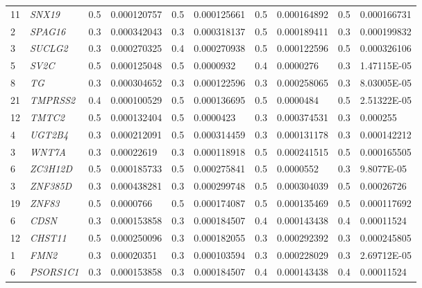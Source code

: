 \begin{refsection}
\begin{otherlanguage}{english}
\begin{scriptsize}
\begin{longtable}{llllllllll}
11 & \cellcolor[HTML]{009901}\textit{SNX19} & 0.5 & 0.000120757 & 0.5 & 0.000125661 & 0.5 & 0.000164892 & 0.5 & 0.000166731 \\
2 & \cellcolor[HTML]{009901}\textit{SPAG16} & 0.3 & 0.000342043 & 0.3 & 0.000318137 & 0.5 & 0.000189411 & 0.3 & 0.000199832 \\
3 & \cellcolor[HTML]{009901}\textit{SUCLG2} & 0.3 & 0.000270325 & 0.4 & 0.000270938 & 0.5 & 0.000122596 & 0.5 & 0.000326106 \\
5 & \cellcolor[HTML]{009901}\textit{SV2C} & 0.5 & 0.000125048 & 0.5 & 0.0000932 & 0.4 & 0.0000276 & 0.3 & 1.47115E-05 \\
8 & \cellcolor[HTML]{009901}\textit{TG} & 0.3 & 0.000304652 & 0.3 & 0.000122596 & 0.3 & 0.000258065 & 0.3 & 8.03005E-05 \\
21 & \cellcolor[HTML]{009901}\textit{TMPRSS2} & 0.4 & 0.000100529 & 0.5 & 0.000136695 & 0.5 & 0.0000484 & 0.5 & 2.51322E-05 \\
12 & \cellcolor[HTML]{009901}\textit{TMTC2} & 0.5 & 0.000132404 & 0.5 & 0.0000423 & 0.3 & 0.000374531 & 0.3 & 0.000255 \\
4 & \cellcolor[HTML]{009901}\textit{UGT2B4} & 0.3 & 0.000212091 & 0.5 & 0.000314459 & 0.3 & 0.000131178 & 0.3 & 0.000142212 \\
3 & \cellcolor[HTML]{009901}\textit{WNT7A} & 0.3 & 0.00022619 & 0.3 & 0.000118918 & 0.5 & 0.000241515 & 0.5 & 0.000165505 \\
6 & \cellcolor[HTML]{009901}\textit{ZC3H12D} & 0.5 & 0.000185733 & 0.5 & 0.000275841 & 0.5 & 0.0000552 & 0.3 & 9.8077E-05 \\
3 & \cellcolor[HTML]{009901}\textit{ZNF385D} & 0.3 & 0.000438281 & 0.3 & 0.000299748 & 0.5 & 0.000304039 & 0.5 & 0.00026726 \\
19 & \cellcolor[HTML]{009901}\textit{ZNF83} & 0.5 & 0.0000766 & 0.5 & 0.000174087 & 0.5 & 0.000135469 & 0.5 & 0.000117692 \\
6 & \cellcolor[HTML]{009901}\textit{CDSN} & 0.3 & 0.000153858 & 0.3 & 0.000184507 & 0.4 & 0.000143438 & 0.4 & 0.00011524 \\
12 & \cellcolor[HTML]{009901}\textit{CHST11} & 0.5 & 0.000250096 & 0.3 & 0.000182055 & 0.3 & 0.000292392 & 0.3 & 0.000245805 \\
1 & \cellcolor[HTML]{009901}\textit{FMN2} & 0.3 & 0.00020351 & 0.3 & 0.000103594 & 0.3 & 0.000228029 & 0.3 & 2.69712E-05 \\
6 & \cellcolor[HTML]{009901}\textit{PSORS1C1} & 0.3 & 0.000153858 & 0.3 & 0.000184507 & 0.4 & 0.000143438 & 0.4 & 0.00011524 \\

\end{longtable}
\end{scriptsize}
\end{otherlanguage}
\end{refsection}
